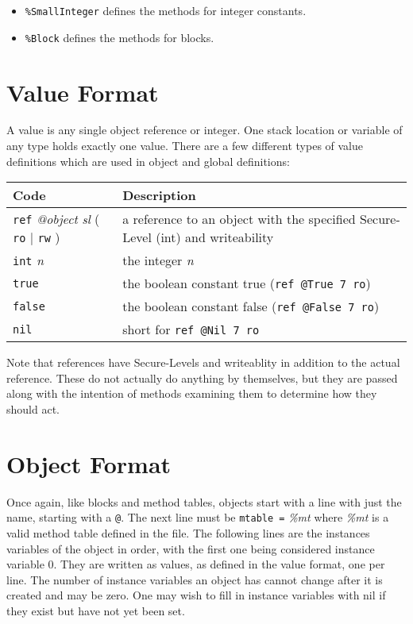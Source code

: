 \documentclass[letterpaper,12pt]{article}
\newcommand{\SecureLevel}{Secure-Level}
\newcommand{\securelevel}{\SecureLevel}
\newcommand{\SecureLevels}{\SecureLevel{}s}
\newcommand{\code}[1]{\texttt{#1}}
\renewcommand{\arg}[1]{\textit{#1}}
\begin{document}
{{{{\begin{itemize}
    \item \code{\%SmallInteger} defines the methods for integer constants.
    \item \code{\%Block} defines the methods for blocks.
\end{itemize}

\section{Value Format}
\label{s:Value Format}

A value is any single object reference or integer. One stack location or
variable of any type holds exactly one value. There are a few different
types of value definitions which are used in object and global definitions:

\begin{tabular}{l|p{3in}}
    Code & Description \\
    \hline
    \code{ref} \arg{@object} \arg{sl} ( \code{ro} $|$ \code{rw} ) &
	a reference to an object with the specified \securelevel{} (int)
	and writeability \\
    \code{int} \arg{n} & the integer \arg{n} \\
    \code{true} \label{true}
	& the boolean constant true \hbox{(\code{ref @True 7 ro})}\\
    \code{false} \label{false}
	& the boolean constant false \hbox{(\code{ref @False 7 ro})}\\
    \code{nil} \label{nil} & short for \hbox{\code{ref @Nil 7 ro}} \\
\end{tabular}

Note that references have \SecureLevels{} and writeablity in addition to the
actual reference. These do not actually do anything by themselves, but
they are passed along with the intention of methods examining them to determine
how they should act.

\section{Object Format}

Once again, like blocks and method tables, objects start with a line with
just the name, starting with a \code{@}. The next line must be
\code{mtable =} \arg{\%mt} where \arg{\%mt} is a valid method table defined
in the file. The following lines are the instances variables of the
object in order, with the first one being considered instance variable 0.
They are written as values, as defined in the value format, one per line.
The number of instance variables an object has cannot change after it is
created and may be zero. One may wish to fill in instance variables with
nil if they exist but have not yet been set.

}}}}
\end{document}
